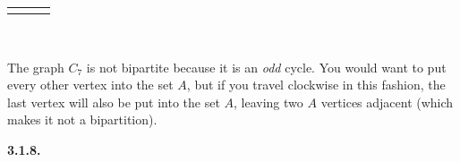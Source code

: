\documentclass[12pt,]{book}
\theoremstyle{plain}
\theoremstyle{definition}
\theoremstyle{definition}
\theoremstyle{definition}
\numberwithin{equation}{chapter}
\newlength{\panelmax}
\begin{document}
{\settototalheight{\phCimage}{\usebox{\panelboxCimage}}
\setlength{\panelmax}{\maxof{\panelmax}{\phCimage}}
\leavevmode%
\setlength{\tabcolsep}{0.0616666666666665\linewidth}
\par\medskip\noindent
\hspace*{0.0616666666666667\linewidth}%
\begin{tabular}{@{}*{3}{c}@{}}
\begin{minipage}[c][\panelmax][c]{0.2\linewidth}\usebox{\panelboxAimage}\end{minipage}&
\begin{minipage}[c][\panelmax][c]{0.23\linewidth}\usebox{\panelboxBimage}\end{minipage}&
\begin{minipage}[c][\panelmax][c]{0.2\linewidth}\usebox{\panelboxCimage}\end{minipage}\end{tabular}\\
}%
\par
\hypertarget{p-1608}{}%
The graph \(C_7\) is not bipartite because it is an \emph{odd} cycle.  You would want to put every other vertex into the set \(A\), but if you travel clockwise in this fashion, the last vertex will also be put into the set \(A\), leaving two \(A\) vertices adjacent (which makes it not a bipartition).%
\par\smallskip
\noindent\textbf{3.1.8.} \hypertarget{p-1615}{}%
\leavevmode%
\end{document}
